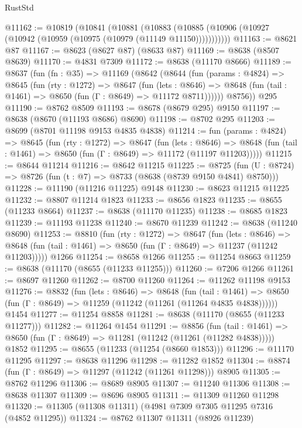 \begin{lexlean}{RustStd}
\begin{coremodule}
@11162 := @10819
    (@10841
      (@10881
        (@10883 (@10885 (@10906 (@10927 (@10942 (@10959 (@10975 (@10979 (@11149 @11150)))))))))))
@11163 := @8621 @87
@11167 := @8623 (@8627 @87) (@8633 @87)
@11169 := @8638 (@8507 @8639)
@11170 := @4831 @7309
@11172 := @8638 (@11170 @8666)
@11189 := @8637
    (fun (fn : @35) =>
    @11169
      (@8642
        (@8644
          (fun (params : @4824) =>
          @8645
            (fun (rty : @1272) =>
            @8647
              (fun (lets : @8646) =>
              @8648 (fun (tail : @1461) => @8650 (fun (Γ : @8649) => @11172 @8711))))))
        @8756))
    @295
@11190 := @8762 @8509
@11193 := @8678 (@8679 @295) @9150
@11197 := @8638 (@8670 (@11193 @8686) @8690)
@11198 := @8702 @295
@11203 := @8699 (@8701 @11198 @9153 @4835 @4838)
@11214 := fun (params : @4824) =>
  @8645
    (fun (rty : @1272) =>
    @8647
      (fun (lets : @8646) =>
      @8648 (fun (tail : @1461) => @8650 (fun (Γ : @8649) => @11172 (@11197 @11203)))))
@11215 := @8644 @11214
@11216 := @8642 @11215
@11225 := @8725 (fun (U : @8724) => @8726 (fun (t : @7) => @8733 (@8638 (@8739 @9150 @4841) @8750)))
@11228 := @11190 (@11216 @11225) @9148
@11230 := @8623 @11215 @11225
@11232 := @8807 @11214 @1823
@11233 := @8656 @1823
@11235 := @8655 (@11233 @8664)
@11237 := @8638 (@11170 @11235)
@11238 := @8685 @1823
@11239 := @11193 @11238
@11240 := @8670 @11239
@11242 := @8638 (@11240 @8690)
@11253 := @8810
    (fun (rty : @1272) =>
    @8647
      (fun (lets : @8646) =>
      @8648 (fun (tail : @1461) => @8650 (fun (Γ : @8649) => @11237 (@11242 @11203)))))
    @1266
@11254 := @8658 @1266
@11255 := @11254 @8663
@11259 := @8638 (@11170 (@8655 (@11233 @11255)))
@11260 := @7206 @1266
@11261 := @8697 @11260
@11262 := @8700 @11260
@11264 := @11262 @11198 @9153
@11276 := @8832
    (fun (lets : @8646) =>
    @8648
      (fun (tail : @1461) =>
      @8650 (fun (Γ : @8649) => @11259 (@11242 (@11261 (@11264 @4835 @4838))))))
    @1454
@11277 := @11254 @8858
@11281 := @8638 (@11170 (@8655 (@11233 @11277)))
@11282 := @11264 @1454
@11291 := @8856
    (fun (tail : @1461) => @8650 (fun (Γ : @8649) => @11281 (@11242 (@11261 (@11282 @4838)))))
    @1852
@11295 := @8655 (@11233 (@11254 (@8660 @1853)))
@11296 := @11170 @11295
@11297 := @8638 @11296
@11298 := @11282 @1852
@11304 := @8874 (fun (Γ : @8649) => @11297 (@11242 (@11261 @11298))) @8905
@11305 := @8762 @11296
@11306 := @8689 @8905
@11307 := @11240 @11306
@11308 := @8638 @11307
@11309 := @8696 @8905
@11311 := @11309 @11260 @11298
@11320 := @11305 (@11308 @11311) (@4981 @7309 @7305 @11295 @7316 (@4852 @11295))
@11324 := @8762 @11307 @11311 (@8926 @11239)

\end{coremodule}
\end{lexlean}
